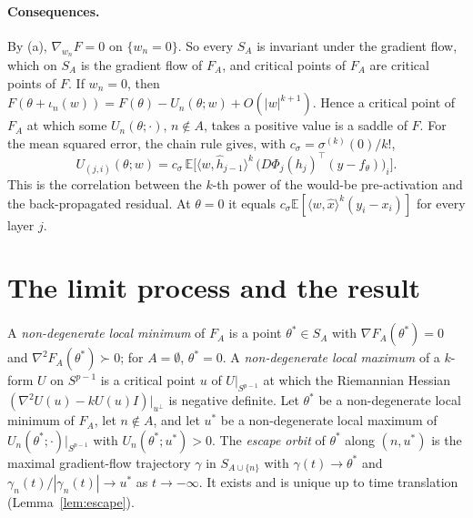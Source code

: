 \documentclass[11pt]{article}
\theoremstyle{definition}
\theoremstyle{remark}
\newcommand{\E}{\mathbb{E}}
\newcommand{\ip}[2]{\langle #1,#2\rangle}
\begin{document}
\paragraph{Consequences.} By (a), $\nabla_{w_n}F=0$ on $\{w_n=0\}$. So every $S_A$ is invariant under the gradient flow, which on $S_A$ is the gradient flow of $F_A$, and critical points of $F_A$ are critical points of $F$. If $w_n=0$, then $F(\theta+\iota_n(w))=F(\theta)-U_n(\theta;w)+O(|w|^{k+1})$. Hence a critical point of $F_A$ at which some $U_n(\theta;\cdot)$, $n\notin A$, takes a positive value is a saddle of $F$. For the mean squared error, the chain rule gives, with $c_\sigma=\sigma^{(k)}(0)/k!$,
\[
U_{(j,i)}(\theta;w)=c_\sigma\,\E\big[\ip{w}{\hat h_{j-1}}^k\,\big(D\Phi_j(h_j)^\top(y-f_\theta)\big)_i\big].
\]
This is the correlation between the $k$-th power of the would-be pre-activation and the back-propagated residual. At $\theta=0$ it equals $c_\sigma\E[\ip{w}{\hat x}^k(y_i-x_i)]$ for every layer $j$.

\section{The limit process and the result}

A \emph{non-degenerate local minimum} of $F_A$ is a point $\theta^*\in S_A$ with $\nabla F_A(\theta^*)=0$ and $\nabla^2F_A(\theta^*)\succ0$; for $A=\emptyset$, $\theta^*=0$. A \emph{non-degenerate local maximum} of a $k$-form $U$ on $S^{p-1}$ is a critical point $u$ of $U|_{S^{p-1}}$ at which the Riemannian Hessian $(\nabla^2U(u)-kU(u)I)|_{u^\perp}$ is negative definite. Let $\theta^*$ be a non-degenerate local minimum of $F_A$, let $n\notin A$, and let $u^*$ be a non-degenerate local maximum of $U_n(\theta^*;\cdot)|_{S^{p-1}}$ with $U_n(\theta^*;u^*)>0$. The \emph{escape orbit} of $\theta^*$ along $(n,u^*)$ is the maximal gradient-flow trajectory $\gamma$ in $S_{A\cup\{n\}}$ with $\gamma(t)\to\theta^*$ and $\gamma_n(t)/|\gamma_n(t)|\to u^*$ as $t\to-\infty$. It exists and is unique up to time translation (Lemma~\ref{lem:escape}).
\end{document}
